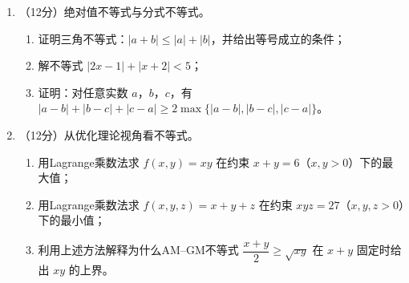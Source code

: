 \documentclass[12pt, a4paper]{ctexart}
\begin{document}
\begin{enumerate}[resume]
\begin{enumerate}[label=(\arabic*)]
    \item 设 $x>0$，$y>0$，$2x+3y=12$，求 $xy$ 的最大值；
    \item 设 $x>0$，$y>0$，$x+y=1$，求 $\left(1+\dfrac{1}{x}\right)\left(1+\dfrac{1}{y}\right)$ 的最小值；
    \item 设 $a$，$b$，$c>0$，$a+b+c=3$，证明 $\dfrac{1}{1+a^2}+\dfrac{1}{1+b^2}+\dfrac{1}{1+c^2}\leq \dfrac{3}{1+abc}$。
\end{enumerate}

\item （12分）绝对值不等式与分式不等式。

\begin{enumerate}[label=(\arabic*)]
    \item 证明三角不等式：$|a+b|\leq |a|+|b|$，并给出等号成立的条件；
    \item 解不等式 $|2x-1|+|x+2|<5$；
    \item 证明：对任意实数 $a$，$b$，$c$，有 $|a-b|+|b-c|+|c-a|\geq 2\max\{|a-b|,|b-c|,|c-a|\}$。
\end{enumerate}

\item （12分）从优化理论视角看不等式。

\begin{enumerate}[label=(\arabic*)]
    \item 用Lagrange乘数法求 $f(x,y)=xy$ 在约束 $x+y=6$（$x,y>0$）下的最大值；
    \item 用Lagrange乘数法求 $f(x,y,z)=x+y+z$ 在约束 $xyz=27$（$x,y,z>0$）下的最小值；
    \item 利用上述方法解释为什么AM--GM不等式 $\dfrac{x+y}{2}\geq \sqrt{xy}$ 在 $x+y$ 固定时给出 $xy$ 的上界。
\end{enumerate}

\end{enumerate}
\end{document}
